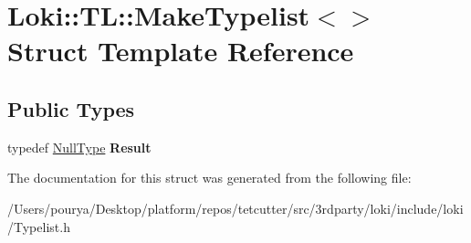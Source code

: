 \hypertarget{structLoki_1_1TL_1_1MakeTypelist_3_4}{}\section{Loki\+:\+:T\+L\+:\+:Make\+Typelist$<$$>$ Struct Template Reference}
\label{structLoki_1_1TL_1_1MakeTypelist_3_4}
\subsection*{Public Types}
\begin{DoxyCompactItemize}
\item 
\hypertarget{structLoki_1_1TL_1_1MakeTypelist_3_4_a8308014986d0c26ef8e8b97b200e3e96}{}typedef \hyperlink{classLoki_1_1NullType}{Null\+Type} {\bfseries Result}\label{structLoki_1_1TL_1_1MakeTypelist_3_4_a8308014986d0c26ef8e8b97b200e3e96}

\end{DoxyCompactItemize}


The documentation for this struct was generated from the following file\+:\begin{DoxyCompactItemize}
\item 
/\+Users/pourya/\+Desktop/platform/repos/tetcutter/src/3rdparty/loki/include/loki/Typelist.\+h\end{DoxyCompactItemize}
